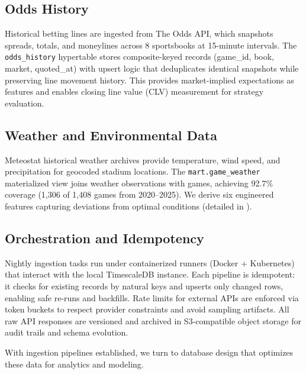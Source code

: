 \subsection{Odds History}
Historical betting lines are ingested from The Odds API, which snapshots spreads, totals, and moneylines across 8 sportsbooks at 15-minute intervals. The \texttt{odds\_history} hypertable stores composite-keyed records (game\_id, book, market, quoted\_at) with upsert logic that deduplicates identical snapshots while preserving line movement history. This provides market-implied expectations as features and enables closing line value (CLV) measurement for strategy evaluation.

\subsection{Weather and Environmental Data}
Meteostat historical weather archives provide temperature, wind speed, and precipitation for geocoded stadium locations. The \texttt{mart.game\_weather} materialized view joins weather observations with games, achieving 92.7\% coverage (1,306 of 1,408 games from 2020--2025). We derive six engineered features capturing deviations from optimal conditions (detailed in ).

\subsection{Orchestration and Idempotency}
Nightly ingestion tasks run under containerized runners (Docker + Kubernetes) that interact with the local TimescaleDB instance. Each pipeline is idempotent: it checks for existing records by natural keys and upserts only changed rows, enabling safe re-runs and backfills. Rate limits for external APIs are enforced via token buckets to respect provider constraints and avoid sampling artifacts. All raw API responses are versioned and archived in S3-compatible object storage for audit trails and schema evolution.

With ingestion pipelines established, we turn to database design that optimizes these data for analytics and modeling.

